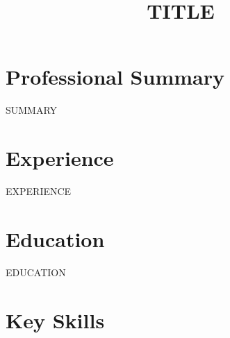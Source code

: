 \documentclass[11pt,a4paper,sans]{moderncv}
\title{ {{TITLE}} }
\begin{document}
\makecvtitle

\section{Professional Summary}
{{SUMMARY}}

\section{Experience}
{{EXPERIENCE}}

\section{Education}
{{EDUCATION}}

\section{Key Skills}
\end{document}
